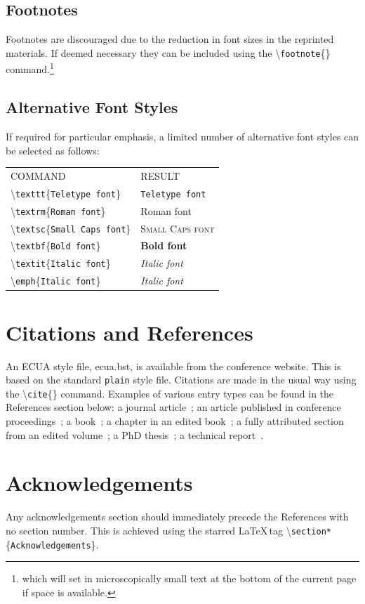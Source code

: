 \documentclass[10pt,a4paper]{article}
\begin{document}
\subsection{Footnotes}
Footnotes are discouraged due to the reduction in font sizes in the reprinted materials. If deemed necessary they can be included using the \textbackslash\texttt{footnote}\{\} command.\footnote{which will set in microscopically small text at the bottom of the current page if space is available.}

\subsection{Alternative Font Styles}

If required for particular emphasis, a limited number of alternative font styles can be selected as follows:

\begin{tabular}{ll}
COMMAND & RESULT \\
\textbackslash\texttt{texttt}\{\texttt{Teletype font}\} & \texttt{Teletype font} \\
\textbackslash\texttt{textrm}\{\texttt{Roman font}\} & \textrm{Roman font} \\
\textbackslash\texttt{textsc}\{\texttt{Small Caps font}\} & \textsc{Small Caps font} \\
\textbackslash\texttt{textbf}\{\texttt{Bold font}\} & \textbf{Bold font} \\
\textbackslash\texttt{textit}\{\texttt{Italic font}\}  & \textit{Italic font} \\
\textbackslash\texttt{emph}\{\texttt{Italic font}\}  & \emph{Italic font} \\
\end{tabular}

\section{Citations and References}
An ECUA \textrm{\BibTeX} style file, ecua.bst, is available from the conference website. This is based on the standard \texttt{plain} style file. Citations are made in the usual way using the \textbackslash\texttt{cite}\{\} command. Examples of various entry types can be found in the References section below: a journal article~\cite{capus:biosonar}; an article published in conference proceedings~\cite{thode:marRecord}; a book~\cite{au:dolphins}; a chapter in an edited book~\cite{abramowitz:handbook}; a fully attributed section from an edited volume~\cite{green:mcmc}; a PhD thesis~\cite{muller:bats}; a technical report~\cite{APL-UW:handbook}. 

\section*{Acknowledgements}
Any acknowledgements section should immediately precede the References with no section number. This is achieved using the starred \textrm{\LaTeX}\,tag \textbackslash\texttt{section*}\{\texttt{Acknowledgements}\}.



\end{document}
